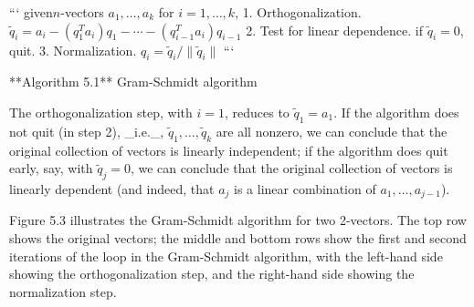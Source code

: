 ``` given\(n\)-vectors \(a_{1},\ldots,a_{k}\) for \(i=1,\ldots,k\), 1. Orthogonalization. \(\tilde{q}_{i}=a_{i}-(q_{1}^{T}a_{i})q_{1}-\cdots-(q_{i-1}^{T}a_{i})q_{i-1}\) 2. Test for linear dependence. if \(\tilde{q}_{i}=0\), quit. 3. Normalization. \(q_{i}=\tilde{q}_{i}/\|\tilde{q}_{i}\|\) ```

**Algorithm 5.1** Gram-Schmidt algorithm

The orthogonalization step, with \(i=1\), reduces to \(\tilde{q}_{1}=a_{1}\). If the algorithm does not quit (in step 2), _i.e._, \(\tilde{q}_{1},\ldots,\tilde{q}_{k}\) are all nonzero, we can conclude that the original collection of vectors is linearly independent; if the algorithm does quit early, say, with \(\tilde{q}_{j}=0\), we can conclude that the original collection of vectors is linearly dependent (and indeed, that \(a_{j}\) is a linear combination of \(a_{1},\ldots,a_{j-1}\)).

Figure 5.3 illustrates the Gram-Schmidt algorithm for two 2-vectors. The top row shows the original vectors; the middle and bottom rows show the first and second iterations of the loop in the Gram-Schmidt algorithm, with the left-hand side showing the orthogonalization step, and the right-hand side showing the normalization step.

 